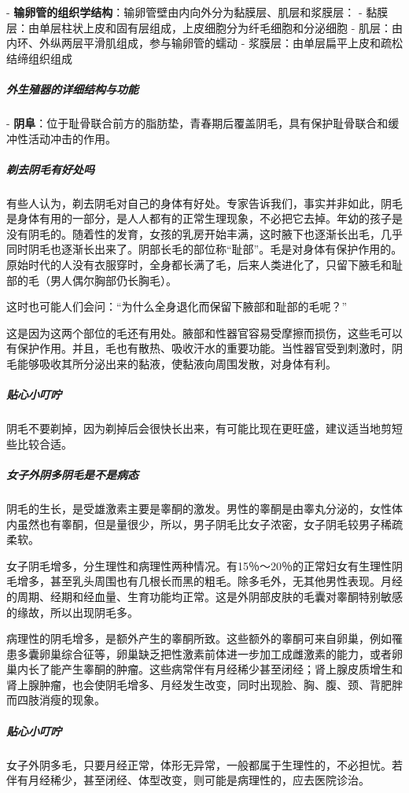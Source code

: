 \begin{enumerate}
- \textbf{输卵管的组织学结构}：输卵管壁由内向外分为黏膜层、肌层和浆膜层：
  - 黏膜层：由单层柱状上皮和固有层组成，上皮细胞分为纤毛细胞和分泌细胞
  - 肌层：由内环、外纵两层平滑肌组成，参与输卵管的蠕动
  - 浆膜层：由单层扁平上皮和疏松结缔组织组成

\subparagraph{外生殖器的详细结构与功能}

- \textbf{阴阜}：位于耻骨联合前方的脂肪垫，青春期后覆盖阴毛，具有保护耻骨联合和缓冲性活动冲击的作用。

\subparagraph{剃去阴毛有好处吗}

有些人认为，剃去阴毛对自己的身体有好处。专家告诉我们，事实并非如此，阴毛是身体有用的一部分，是人人都有的正常生理现象，不必把它去掉。年幼的孩子是没有阴毛的。随着性的发育，女孩的乳房开始丰满，这时腋下也逐渐长出毛，几乎同时阴毛也逐渐长出来了。阴部长毛的部位称“耻部”。毛是对身体有保护作用的。原始时代的人没有衣服穿时，全身都长满了毛，后来人类进化了，只留下腋毛和耻部的毛（男人偶尔胸部仍长胸毛）。

这时也可能人们会问：“为什么全身退化而保留下腋部和耻部的毛呢？”

这是因为这两个部位的毛还有用处。腋部和性器官容易受摩擦而损伤，这些毛可以有保护作用。并且，毛也有散热、吸收汗水的重要功能。当性器官受到刺激时，阴毛能够吸收其所分泌出来的黏液，使黏液向周围发散，对身体有利。

\subparagraph{贴心小叮咛}

阴毛不要剃掉，因为剃掉后会很快长出来，有可能比现在更旺盛，建议适当地剪短些比较合适。

\subparagraph{女子外阴多阴毛是不是病态}

阴毛的生长，是受雄激素主要是睾酮的激发。男性的睾酮是由睾丸分泌的，女性体内虽然也有睾酮，但是量很少，所以，男子阴毛比女子浓密，女子阴毛较男子稀疏柔软。

女子阴毛增多，分生理性和病理性两种情况。有15％～20％的正常妇女有生理性阴毛增多，甚至乳头周围也有几根长而黑的粗毛。除多毛外，无其他男性表现。月经的周期、经期和经血量、生育功能均正常。这是外阴部皮肤的毛囊对睾酮特别敏感的缘故，所以出现阴毛多。

病理性的阴毛增多，是额外产生的睾酮所致。这些额外的睾酮可来自卵巢，例如罹患多囊卵巢综合征等，卵巢缺乏把性激素前体进一步加工成雌激素的能力，或者卵巢内长了能产生睾酮的肿瘤。这些病常伴有月经稀少甚至闭经；肾上腺皮质增生和肾上腺肿瘤，也会使阴毛增多、月经发生改变，同时出现脸、胸、腹、颈、背肥胖而四肢消瘦的现象。

\subparagraph{贴心小叮咛}

女子外阴多毛，只要月经正常，体形无异常，一般都属于生理性的，不必担忧。若伴有月经稀少，甚至闭经、体型改变，则可能是病理性的，应去医院诊治。


\end{enumerate}
